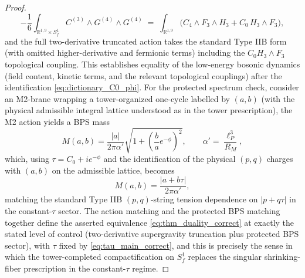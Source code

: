 \documentclass[10pt,a4paper]{amsart}
\begin{document}
\begin{proof}
\begin{equation}
-\frac{1}{6}\int_{\mathbb{R}^{1,9}\times S_f^{1}} C^{(3)}\wedge G^{(4)}\wedge G^{(4)}
\;=\;\int_{\mathbb{R}^{1,9}}\!\bigl(C_4\wedge F_3\wedge H_3 + C_0\,H_3\wedge F_3\bigr),
\end{equation}
and the full two-derivative truncated action takes the standard Type IIB form (with omitted higher-derivative and fermionic terms) including the $C_0 H_3\wedge F_3$ topological coupling. This establishes equality of the low-energy bosonic dynamics (field content, kinetic terms, and the relevant topological couplings) after the identification \eqref{eq:dictionary_C0_phi}. For the protected spectrum check, consider an M2-brane wrapping a tower-organized one-cycle labelled by $(a,b)$ (with the physical admissible integral lattice understood as in the tower prescription), the M2 action yields a BPS mass
\begin{equation}\label{eq:M2_mass}
M(a,b)=\frac{|a|}{2\pi\alpha'}\sqrt{1+\left(\frac{b}{a}e^{-\phi}\right)^2},
\qquad
\alpha'=\frac{\ell_P^{3}}{R_M},
\end{equation}
which, using $\tau=C_0+i e^{-\phi}$ and the identification of the physical $(p,q)$ charges with $(a,b)$ on the admissible lattice, becomes
\begin{equation}\label{eq:BPS_match}
M(a,b)=\frac{|a+b\tau|}{2\pi\alpha'},
\end{equation}
matching the standard Type IIB $(p,q)$-string tension dependence on $|p+q\tau|$ in the constant-$\tau$ sector. The action matching and the protected BPS matching together define the asserted equivalence \eqref{eq:thm_duality_correct} at exactly the stated level of control (two-derivative supergravity truncation plus protected BPS sector), with $\tau$ fixed by \eqref{eq:tau_main_correct}, and this is precisely the sense in which the tower-completed compactification on $S_f^{1}$ replaces the singular shrinking-fiber prescription in the constant-$\tau$ regime.
\end{proof}
\end{document}
